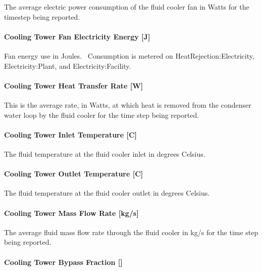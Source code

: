 The average electric power consumption of the fluid cooler fan in Watts for the timestep being reported.

\paragraph{Cooling Tower Fan Electricity Energy {[}J{]}}\label{cooling-tower-fan-electric-energy-j-4}

Fan energy use in Joules.~ Consumption is metered on HeatRejection:Electricity, Electricity:Plant, and Electricity:Facility.

\paragraph{Cooling Tower Heat Transfer Rate {[}W{]}}\label{cooling-tower-heat-transfer-rate-w-4}

This is the average rate, in Watts, at which heat is removed from the condenser water loop by the fluid cooler for the time step being reported.

\paragraph{Cooling Tower Inlet Temperature {[}C{]}}\label{cooling-tower-inlet-temperature-c-4}

The fluid temperature at the fluid cooler inlet in degrees Celsius.

\paragraph{Cooling Tower Outlet Temperature {[}C{]}}\label{cooling-tower-outlet-temperature-c-4}

The fluid temperature at the fluid cooler outlet in degrees Celsius.

\paragraph{Cooling Tower Mass Flow Rate {[}kg/s{]}}\label{cooling-tower-mass-flow-rate-kgs-4}

The average fluid mass flow rate through the fluid cooler in kg/s for the time step being reported.

\paragraph{Cooling Tower Bypass Fraction {[]}}\label{cooling-tower-bypass-fraction-1}

